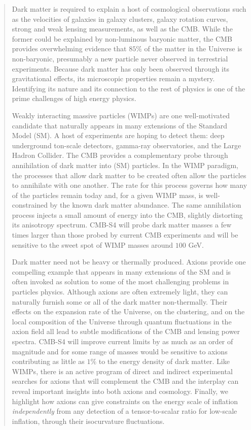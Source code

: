 \begin{quotation}

Dark matter is required to explain a host of cosmological observations such as the velocities of galaxies in galaxy clusters, galaxy rotation curves, strong and weak lensing measurements, as well as the CMB. While the former could be explained by non-luminous baryonic matter, the CMB provides overwhelming evidence that $85\%$ of the matter in the Universe is non-baryonic, presumably a new particle never observed in terrestrial experiments. Because dark matter has only been observed through its gravitational effects, its microscopic properties remain a mystery. Identifying its nature and its connection to the rest of physics is one of the prime challenges of high energy physics.

Weakly interacting massive particles (WIMPs) are one well-motivated candidate that naturally appears in many extensions of the Standard Model (SM). A host of experiments are hoping to detect them: deep underground ton-scale detectors, gamma-ray observatories, and the Large Hadron Collider. The CMB provides a complementary probe through annihilation of dark matter into (SM) particles.   In the WIMP paradigm, the processes that allow dark matter to be created often allow the particles to annihilate with one another. The rate for this process governs how many of the particles remain today and, for a given WIMP mass, is well-constrained by the known dark matter abundance. The same annihilation process injects a small amount of energy into the CMB, slightly distorting its anisotropy spectrum. CMB-S4 will probe dark matter masses a few times larger than those probed by current CMB experiments and will be sensitive to the sweet spot of WIMP masses around $100$ GeV.            

Dark matter need not be heavy or thermally produced. Axions provide one compelling example that appears in many extensions of the SM and is often invoked as solution to some of the most challenging problems in particles physics. Although axions are often extremely light, they can naturally furnish some or all of the dark matter non-thermally. Their effects on the expansion rate of the Universe, on the clustering, and on the local composition of the Universe through quantum fluctuations in the axion field all lead to subtle modifications of the CMB and lensing power spectra. CMB-S4 will improve current limits by as much as an order of magnitude and for some range of masses would be sensitive to axions contributing as little as $1\%$ to the energy density of dark matter.  Like WIMPs, there is an active program of direct and indirect experimental searches for axions that will complement the CMB and the interplay can reveal important insights into both axions and cosmology. Finally, we highlight how axions can give constraints on the energy scale of inflation \textit{independently} from any detection of a tensor-to-scalar ratio for low-scale inflation, through their isocurvature fluctuations.


\end{quotation}
